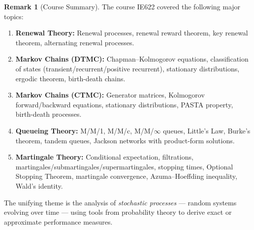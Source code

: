 \documentclass[12pt, a4paper]{article}
\theoremstyle{definition}
\newtheorem{remark}{Remark}[section]
\theoremstyle{plain}
\begin{document}
\begin{remark}[Course Summary]
The course IE622 covered the following major topics:
\begin{enumerate}[label=(\roman*)]
  \item \textbf{Renewal Theory:} Renewal processes, renewal reward theorem, key renewal theorem, alternating renewal processes.
  \item \textbf{Markov Chains (DTMC):} Chapman--Kolmogorov equations, classification of states (transient/recurrent/positive recurrent), stationary distributions, ergodic theorem, birth-death chains.
  \item \textbf{Markov Chains (CTMC):} Generator matrices, Kolmogorov forward/backward equations, stationary distributions, PASTA property, birth-death processes.
  \item \textbf{Queueing Theory:} M/M/1, M/M/c, M/M/$\infty$ queues, Little's Law, Burke's theorem, tandem queues, Jackson networks with product-form solutions.
  \item \textbf{Martingale Theory:} Conditional expectation, filtrations, martingales/submartingales/supermartingales, stopping times, Optional Stopping Theorem, martingale convergence, Azuma--Hoeffding inequality, Wald's identity.
\end{enumerate}
The unifying theme is the analysis of \emph{stochastic processes} — random systems evolving over time — using tools from probability theory to derive exact or approximate performance measures.
\end{remark}
\end{document}
